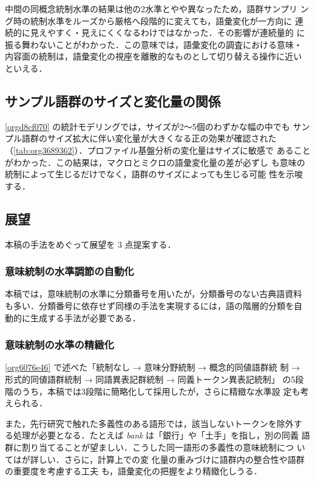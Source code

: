 \documentclass[submit]{ipsj}
\renewcommand{\ref}{\cref}
\begin{document}
中間の同概念統制水準の結果は他の2水準とやや異なったため，語群サンプリ
ング時の統制水準をルーズから厳格へ段階的に変えても，語彙変化が一方向に
連続的に見えやすく・見えにくくなるわけではなかった．その影響が連続量的
に振る舞わないことがわかった．この意味では，語彙変化の調査における意味・
内容面の統制は，語彙変化の視座を離散的なものとして切り替える操作に近い
といえる．
\subsection{サンプル語群のサイズと変化量の関係\label{orgb713b08}}
\label{sec:org42e8f4b}
\ref{orgd8cf070} の統計モデリングでは，サイズが2〜5個のわずかな幅の中でも
サンプル語群のサイズ拡大に伴い変化量が大きくなる正の効果が確認された
（\ref{tab:org3689362}）．プロファイル基盤分析の変化量はサイズに敏感で
あることがわかった．この結果は，マクロとミクロの語彙変化量の差が必ずし
も意味の統制によって生じるだけでなく，語群のサイズによっても生じる可能
性を示唆する．
\subsection{展望\label{org1e04760}}
\label{sec:org7178c4a}
本稿の手法をめぐって展望を 3 点提案する．
\subsubsection{意味統制の水準調節の自動化\label{org5691aa0}}
\label{sec:orga05416a}
本稿では，意味統制の水準に分類番号を用いたが，分類番号のない古典語資料
も多い．分類番号に依存せず同様の手法を実現するには，語の階層的分類を自
動的に生成する手法が必要である．
\subsubsection{意味統制の水準の精緻化\label{orgbb6c286}}
\label{sec:org1f23926}
\ref{org6076e46} で述べた「統制なし → 意味分野統制 → 概念的同値語群統
制 → 形式的同値語群統制 → 同語異表記群統制 → 同義トークン異表記統制」
の5段階のうち，本稿では3段階に簡略化して採用したが，さらに精緻な水準設
定も考えられる．

また，先行研究で触れた多義性のある語形では，該当しないトークンを除外す
る処理が必要となる．たとえば \emph{bank} は「銀行」や「土手」を指し，別の同義
語群に割り当てることが望ましい．こうした同一語形の多義性の意味統制につ
いては\cite{DePascale2021Scoring}が詳しい．さらに，計算上での変
化量の重みづけに語群内の整合性や語群の重要度を考慮する工夫
\cite{Ruette2014Semantic} も，語彙変化の把握をより精緻化しうる．
\end{document}

